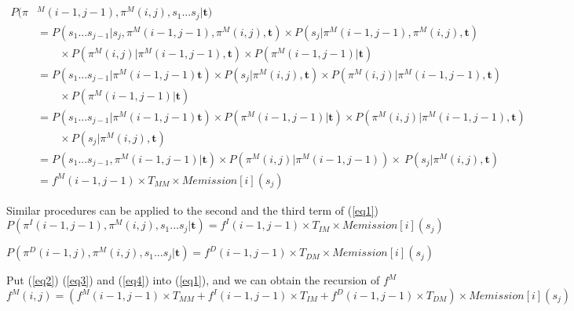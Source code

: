 \documentclass[10pt]{article}
\begin{document}
    
    \begin{equation} \label{eq2}
    \begin{aligned}
      P(\pi&^M(i-1, j-1), \pi^M(i, j), s_1...s_j | \mathbf{t}) \\
        & = P(s_1...s_{j-1} | s_j, \pi^M(i-1, j-1), \pi^M(i, j), \mathbf{t}) \times P(s_j | \pi^M(i-1, j-1), \pi^M(i, j), \mathbf{t}) \\
          &\qquad \times P(\pi^M(i, j) | \pi^M(i-1, j-1), \mathbf{t}) \times P(\pi^M(i-1, j-1) | \mathbf{t}) \\
        & = P(s_1...s_{j-1} | \pi^M(i-1, j-1) \mathbf{t}) \times P(s_j | \pi^M(i, j), \mathbf{t}) \times P(\pi^M(i, j) | \pi^M(i-1, j-1), \mathbf{t})\\
          &\qquad \times P(\pi^M(i-1, j-1) | \mathbf{t}) \\
        & = P(s_1...s_{j-1} | \pi^M(i-1, j-1) \mathbf{t}) \times P(\pi^M(i-1, j-1) | \mathbf{t}) \times P(\pi^M(i, j) | \pi^M(i-1, j-1), \mathbf{t}) \\
          &\qquad \times P(s_j | \pi^M(i, j), \mathbf{t}) \\
        & = P(s_1...s_{j-1}, \pi^M(i-1, j-1) | \mathbf{t}) \times P(\pi^M(i, j) | \pi^M(i-1, j-1)) \times\ 
        P(s_j | \pi^M(i, j), \mathbf{t}) \\
        & = f^{M}(i-1, j-1) \times T_{MM} \times Memission[i](s_j)
    \end{aligned}
    \end{equation}

    Similar procedures can be applied to the second and the third term of (\ref{eq1})
    \begin{equation} \label{eq3}
      P(\pi^I(i-1, j-1), \pi^M(i, j), s_1...s_j | \mathbf{t}) = f^{I}(i-1, j-1) \times T_{IM} \times Memission[i](s_j)
    \end{equation}

    \begin{equation} \label{eq4}
      P(\pi^D(i-1, j), \pi^M(i, j), s_1...s_j | \mathbf{t}) = f^{D}(i-1, j-1) \times T_{DM} \times Memission[i](s_j)
    \end{equation}
    
    Put (\ref{eq2}) (\ref{eq3}) and (\ref{eq4}) into (\ref{eq1}), and we can obtain the recursion of $f^{M}$
    \begin{equation}
      f^{M}(i, j) = (f^{M}(i-1, j-1) \times T_{MM}  + f^{I}(i-1, j-1) \times T_{IM} + f^{D}(i-1, j-1) \times T_{DM}) \times Memission[i](s_j)
    \end{equation}
\end{document}
